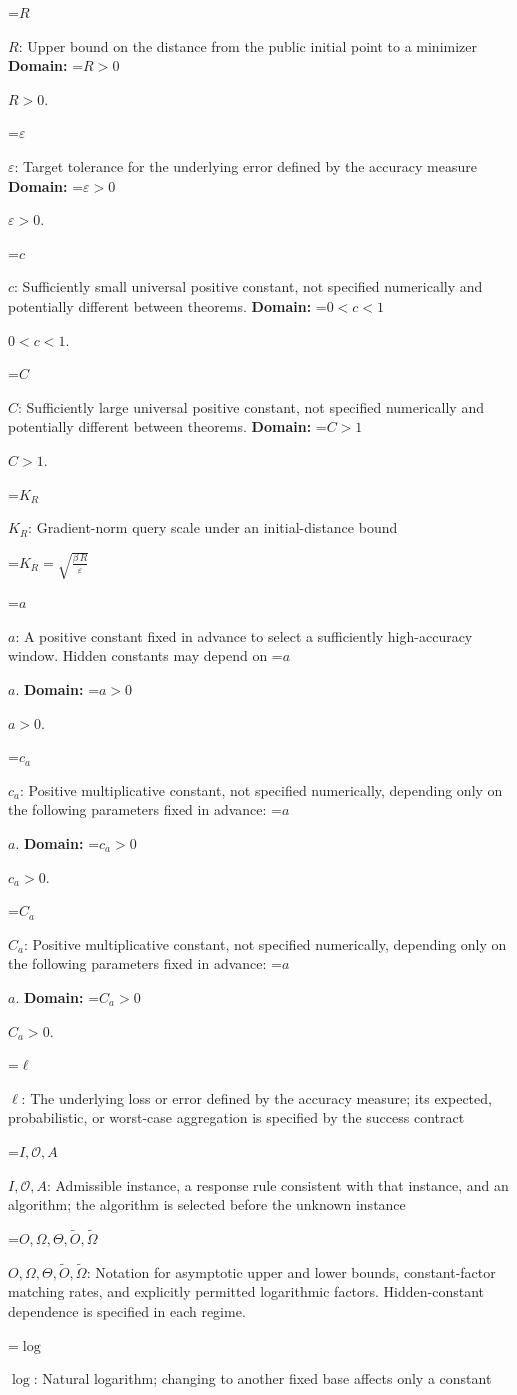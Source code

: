 \documentclass[10pt,a4paper]{article}
\newcommand{\AtlasMath}[1]{\par\begingroup\centering\setbox0=\hbox{$\displaystyle #1$}\ifdim\wd0>1.4\linewidth\typeout{ATLAS WIDE FORMULA: \the\wd0}\fi\ifdim\wd0>\linewidth\resizebox{\linewidth}{!}{\box0}\else\box0\fi\par\endgroup}
\newcommand{\AtlasInlineMath}[1]{\begingroup\setbox0=\hbox{$#1$}\ifdim\wd0>.4\linewidth\endgroup\AtlasMath{#1}\else\endgroup$#1$\fi}
\begin{document}
\AtlasInlineMath{R}: Upper bound on the distance from the public initial point to a minimizer \textbf{Domain:} \AtlasInlineMath{R>0}.

\AtlasInlineMath{\varepsilon}: Target tolerance for the underlying error defined by the accuracy measure \textbf{Domain:} \AtlasInlineMath{\varepsilon>0}.

\AtlasInlineMath{c}: Sufficiently small universal positive constant, not specified numerically and potentially different between theorems. \textbf{Domain:} \AtlasInlineMath{0<c<1}.

\AtlasInlineMath{C}: Sufficiently large universal positive constant, not specified numerically and potentially different between theorems. \textbf{Domain:} \AtlasInlineMath{C>1}.

\AtlasInlineMath{K_R}: Gradient-norm query scale under an initial-distance bound


\AtlasMath{K_R=\sqrt{\frac{\beta\,R}{\varepsilon}}}


\AtlasInlineMath{a}: A positive constant fixed in advance to select a sufficiently high-accuracy window. Hidden constants may depend on \AtlasInlineMath{a}. \textbf{Domain:} \AtlasInlineMath{a>0}.

\AtlasInlineMath{c_{a}}: Positive multiplicative constant, not specified numerically, depending only on the following parameters fixed in advance: \AtlasInlineMath{a}. \textbf{Domain:} \AtlasInlineMath{c_{a}>0}.

\AtlasInlineMath{C_{a}}: Positive multiplicative constant, not specified numerically, depending only on the following parameters fixed in advance: \AtlasInlineMath{a}. \textbf{Domain:} \AtlasInlineMath{C_{a}>0}.

\AtlasInlineMath{\ell}: The underlying loss or error defined by the accuracy measure; its expected, probabilistic, or worst-case aggregation is specified by the success contract

\AtlasInlineMath{I,\mathcal{O},A}: Admissible instance, a response rule consistent with that instance, and an algorithm; the algorithm is selected before the unknown instance

\AtlasInlineMath{O,\Omega,\Theta,\widetilde{O},\widetilde\Omega}: Notation for asymptotic upper and lower bounds, constant-factor matching rates, and explicitly permitted logarithmic factors. Hidden-constant dependence is specified in each regime.

\AtlasInlineMath{\log}: Natural logarithm; changing to another fixed base affects only a constant
\end{document}
